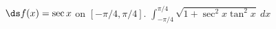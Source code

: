 {$\ds f(x) = \sec x$ on $[-\pi/4,\pi/4]$.\label{ex_07_04_ex_20}}
{$\int_{-\pi/4}^{\pi/4} \sqrt{1+\sec^2x\tan^2x}\ dx$}
